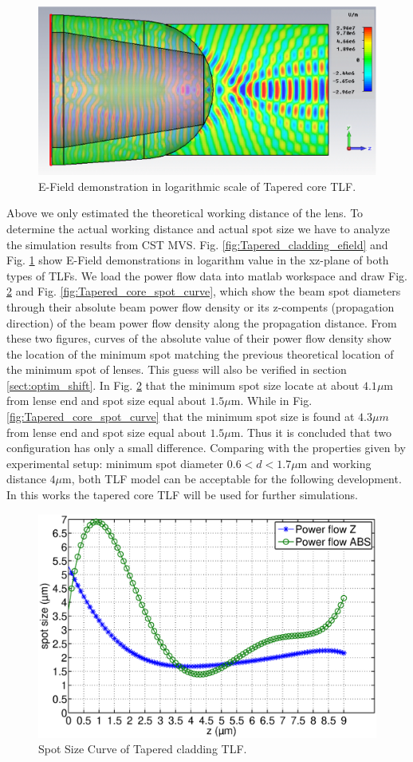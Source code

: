 \begin{figure}[!ht]
	\centering
		\includegraphics[width=0.8 \textwidth]{bilder/cst_lensed_fiber_efield}
		\caption{E-Field demonstration in logarithmic scale of Tapered core TLF.}
 		\label{fig:Tapered_core_efield}	
\end{figure}
Above we only estimated the theoretical working distance of the lens. To determine the actual working distance and actual spot size we have to analyze the simulation results from CST MVS. Fig. \ref{fig:Tapered_cladding_efield} and Fig. \ref{fig:Tapered_core_efield} show  E-Field demonstrations  in logarithm value in the xz-plane of both types of TLFs. We load the power flow data into matlab workspace and draw Fig. \ref{fig:Tapered_cladding_spot_curve} and Fig. \ref{fig:Tapered_core_spot_curve}, which show the beam spot diameters through their absolute beam power flow density or its z-compents (propagation direction) of the beam power flow density along the propagation distance. From these two figures, curves of the absolute value of their power flow density show the location of the minimum spot matching the previous theoretical location of the minimum spot of lenses. This guess will also be verified in section \ref{sect:optim_shift}. In Fig. \ref{fig:Tapered_cladding_spot_curve} that the minimum spot size locate at about $4.1 \mu$m from lense end and spot size equal about $1.5 \mu$m. While in Fig. \ref{fig:Tapered_core_spot_curve} that the minimum spot size is found at  $4.3 \mu m$ from lense end and spot size equal about $1.5 \mu$m. Thus it is concluded that two configuration has only a small difference. Comparing with the properties given by experimental setup: minimum spot diameter $0.6<d<1.7 \mu$m and working distance $4\mu$m, both TLF model can be acceptable for the following development. In this works the tapered core TLF will be used for further simulations.
\begin{figure}[!ht]
		\centering
		\includegraphics[width=0.7 \textwidth]{bilder/Tapered_cladding_spot_curve}
		\caption{Spot Size Curve of Tapered cladding TLF.}
		\label{fig:Tapered_cladding_spot_curve}
\end{figure} 
